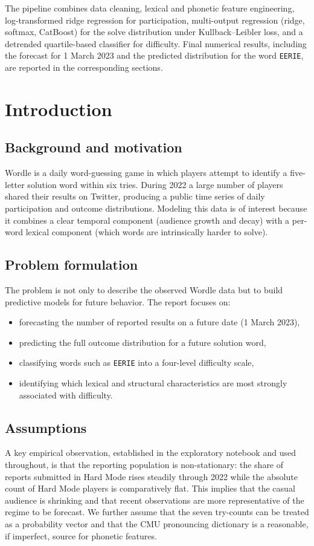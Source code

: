\documentclass{article}
\begin{document}
The pipeline combines data cleaning, lexical and phonetic feature engineering,
log-transformed ridge regression for participation, multi-output regression
(ridge, softmax, CatBoost) for the solve distribution under Kullback--Leibler
loss, and a detrended quartile-based classifier for difficulty. Final numerical
results, including the forecast for 1 March 2023 and the predicted distribution
for the word \texttt{EERIE}, are reported in the corresponding sections.

\section{Introduction}

\subsection*{Background and motivation}
Wordle is a daily word-guessing game in which players attempt to identify a
five-letter solution word within six tries. During 2022 a large number of
players shared their results on Twitter, producing a public time series of
daily participation and outcome distributions. Modeling this data is of
interest because it combines a clear temporal component (audience growth and
decay) with a per-word lexical component (which words are intrinsically harder
to solve).

\subsection*{Problem formulation}
The problem is not only to describe the observed Wordle data but to build
predictive models for future behavior. The report focuses on:

\begin{itemize}
  \item forecasting the number of reported results on a future date
        (1 March 2023),
  \item predicting the full outcome distribution for a future solution word,
  \item classifying words such as \texttt{EERIE} into a four-level difficulty
        scale,
  \item identifying which lexical and structural characteristics are most
        strongly associated with difficulty.
\end{itemize}

\subsection*{Assumptions}
A key empirical observation, established in the exploratory notebook and used
throughout, is that the reporting population is non-stationary: the share of
reports submitted in Hard Mode rises steadily through 2022 while the absolute
count of Hard Mode players is comparatively flat. This implies that the casual
audience is shrinking and that recent observations are more representative of
the regime to be forecast. We further assume that the seven try-counts can be
treated as a probability vector and that the CMU pronouncing dictionary is a
reasonable, if imperfect, source for phonetic features.
\end{document}

